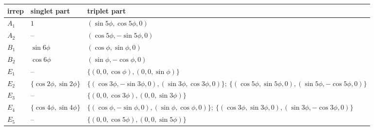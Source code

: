 \begin{tabular}{lll}
\hline
irrep & singlet part & triplet part \\
\hline
$A_1$ & $1$ & $(\sin 5\phi, \cos 5\phi, 0)$ \\
$A_2$ & -- & $(\cos 5\phi, -\sin 5\phi, 0)$ \\
$B_1$ & $\sin 6\phi$ & $(\cos\phi, \sin\phi, 0)$ \\
$B_2$ & $\cos 6\phi$ & $(\sin\phi, -\cos\phi, 0)$ \\
$E_1$ & -- & $\{(0, 0, \cos\phi), (0, 0, \sin\phi)\}$ \\
$E_2$ & $\{\cos 2\phi, \sin 2\phi\}$ & $\{(\cos 3\phi, -\sin 3\phi, 0), (\sin 3\phi, \cos 3\phi, 0)\};\ \{(\cos 5\phi, \sin 5\phi, 0), (\sin 5\phi, -\cos 5\phi, 0)\}$ \\
$E_3$ & -- & $\{(0, 0, \cos 3\phi), (0, 0, \sin 3\phi)\}$ \\
$E_4$ & $\{\cos 4\phi, \sin 4\phi\}$ & $\{(\cos\phi, -\sin\phi, 0), (\sin\phi, \cos\phi, 0)\};\ \{(\cos 3\phi, \sin 3\phi, 0), (\sin 3\phi, -\cos 3\phi, 0)\}$ \\
$E_5$ & -- & $\{(0, 0, \cos 5\phi), (0, 0, \sin 5\phi)\}$ \\
\hline
\end{tabular}

